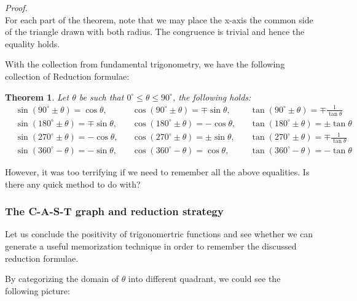 \documentclass[12pt]{article}
\newtheorem*{theorem}{Theorem}
\renewenvironment{proof}[1][Proof]{\begin{snugshade*} \textit{{#1}.}\\}{\hfill \qedsymbol \end{snugshade*}}
\begin{document}
    \begin{proof}
        For each part of the theorem, note that we may place the x-axis the common side of the triangle drawn with both radius. The congruence is trivial and hence the equality holds.
    \end{proof}

    With the collection from fundamental trigonometry, we have the following collection of Reduction formulae:

    \begin{theorem}
        Let $\theta$ be such that $0^\circ\leq \theta\leq 90^\circ$, the following holds: \begin{align*}
            &\sin(90^\circ\pm\theta)=\cos{\theta},&&\cos(90^\circ\pm\theta)=\mp\sin{\theta},&&\tan(90^\circ\pm\theta)=\mp\frac{1}{\tan{\theta}}\\
            &\sin(180^\circ\pm\theta)=\mp\sin{\theta},&&\cos(180^\circ\pm\theta)=-\cos{\theta},&&\tan(180^\circ\pm\theta)=\pm\tan{\theta}\\
            &\sin(270^\circ\pm\theta)=-\cos{\theta},&&\cos(270^\circ\pm\theta)=\pm\sin{\theta},&&\tan(270^\circ\pm\theta)=\mp\frac{1}{\tan{\theta}}\\
            &\sin(360^\circ - \theta)=-\sin{\theta},&&\cos(360^\circ - \theta)=\cos{\theta},&&\tan(360^\circ - \theta)=-\tan{\theta}
        \end{align*}
    \end{theorem}

    However, it was too terrifying if we need to remember all the above equalities. Is there any quick method to do with?

    \subsubsection*{The C-A-S-T graph and reduction strategy}

    Let us conclude the positivity of trigonomertric functions and see whether we can generate a useful memorization technique in order to remember the discussed reduction formulae.

    By categorizing the domain of $\theta$ into different quadrant, we could see the following picture:
\end{document}
